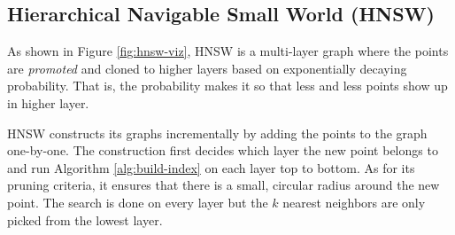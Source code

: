 \subsection{Hierarchical Navigable Small World (HNSW)}

As shown in Figure \ref{fig:hnsw-viz}, HNSW is a multi-layer graph where the points are \textit{promoted} and cloned to higher layers based on exponentially decaying probability. That is, the probability makes it so that less and less points show up in higher layer.

HNSW constructs its graphs incrementally by adding the points to the graph one-by-one. The construction first decides which layer the new point belongs to and run Algorithm \ref{alg:build-index} on each layer top to bottom. As for its pruning criteria, it ensures that there is a small, circular radius around the new point. The search is done on every layer but the \(k\) nearest neighbors are only picked from the lowest layer.






